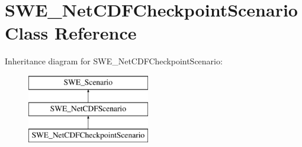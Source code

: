 \hypertarget{classSWE__NetCDFCheckpointScenario}{\section{S\-W\-E\-\_\-\-Net\-C\-D\-F\-Checkpoint\-Scenario Class Reference}
\label{classSWE__NetCDFCheckpointScenario}
}
Inheritance diagram for S\-W\-E\-\_\-\-Net\-C\-D\-F\-Checkpoint\-Scenario\-:\begin{figure}[H]
\begin{center}
\leavevmode
\includegraphics[height=3.000000cm]{classSWE__NetCDFCheckpointScenario}
\end{center}
\end{figure}
